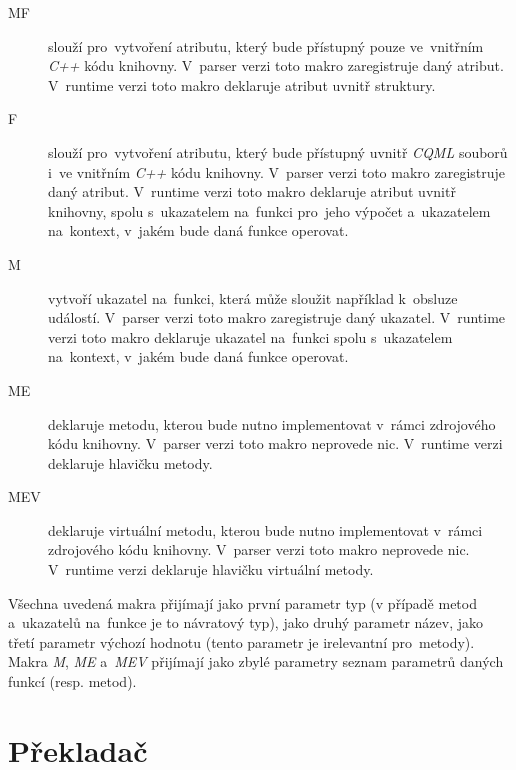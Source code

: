 \documentclass[11pt,twoside,a4paper]{book}
\begin{document}
\begin{description}
\item[MF] slouží pro~vytvoření atributu, který bude přístupný pouze ve~vnitřním \textit{C++} kódu knihovny. V~parser verzi toto makro zaregistruje daný atribut. V~runtime verzi toto makro deklaruje atribut uvnitř struktury.
\item[F] slouží pro~vytvoření atributu, který bude přístupný uvnitř \textit{CQML} souborů i~ve vnitřním \textit{C++} kódu knihovny. V~parser verzi toto makro zaregistruje daný atribut. V~runtime verzi toto makro deklaruje atribut uvnitř knihovny, spolu s~ukazatelem na~funkci pro~jeho výpočet a~ukazatelem na~kontext, v~jakém bude daná funkce  operovat.
\item[M] vytvoří ukazatel na~funkci, která může sloužit například k~obsluze událostí. V~parser verzi toto makro zaregistruje daný ukazatel. V~runtime verzi toto makro deklaruje ukazatel na~funkci spolu s~ukazatelem na~kontext, v~jakém bude daná funkce operovat. 
\item[ME] deklaruje metodu, kterou bude nutno implementovat v~rámci zdrojového kódu knihovny. V~parser verzi toto makro neprovede nic. V~runtime verzi deklaruje hlavičku metody.
\item[MEV] deklaruje virtuální metodu, kterou bude nutno implementovat v~rámci zdrojového kódu knihovny. V~parser verzi toto makro neprovede nic. V~runtime verzi deklaruje hlavičku virtuální metody.
\end{description}
Všechna uvedená makra přijímají jako první parametr typ (v případě metod a~ukazatelů na~funkce je to návratový typ), jako druhý parametr název, jako třetí parametr výchozí hodnotu (tento parametr je irelevantní pro~metody). Makra \textit{M}, \textit{ME} a~\textit{MEV} přijímají jako zbylé parametry seznam parametrů daných funkcí (resp. metod).\\



\section{\label{SEC:transImpl}Překladač}
\end{document}
